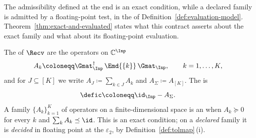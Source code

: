 
The admissibility defined at the end is an exact condition, while a declared
family is admitted by a floating-point test, in the  of
Definition~\ref{def:evaluation-model}.
Theorem~\ref{thm:exact-and-evaluated} states what this contract asserts about
the exact family and what about its floating-point evaluation.

\begin{definition}\label{def:gram}
The  of $\Recv$ are the operators on
$\mathbb{C}^{\Inp}$
\begin{equation}\label{eq:gramdef}
  A_k\coloneqq\Gmat_{\Inp}^\dagger\,\Emd{\{k\}}\,\Gmat_{\Inp},
  \qquad k=1,\dots,K ,
\end{equation}
and for $J\subseteq[K]$ we write $A_J\coloneqq\sum_{k\in J}A_k$ and
$A_\Sigma\coloneqq A_{[K]}$. The  is
\begin{equation}\label{eq:deficiency}
  \defic\coloneqq\id_{\Inp}-A_\Sigma .
\end{equation}
A family $\{A_k\}_{k=1}^{K}$ of operators on a finite-dimensional space is an
 when $A_k\succeq0$ for every $k$ and
$\sum_kA_k\preceq\id$. This is an exact condition; on a \emph{declared} family
it is \emph{decided} in floating point at the
$\varepsilon_2$, by Definition~\ref{def:tolmap}\,(i).
\end{definition}
